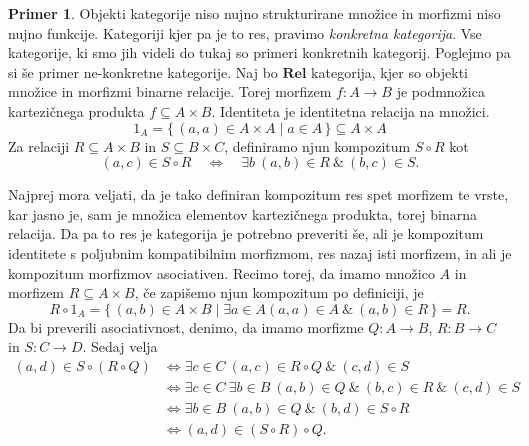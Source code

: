 \documentclass[12pt,a4paper]{book}
\theoremstyle{definition}
\theoremstyle{plain}
\theoremstyle{definition}
\newtheorem{primer}{Primer}[section]
\theoremstyle{remark}
\newcommand{\cat}[1]{\textbf{#1}}
\renewcommand{\set}[1]{\{\,#1\,\}}
\begin{document}
\begin{primer}
Objekti kategorije niso nujno strukturirane množice in morfizmi niso nujno funkcije. Kategoriji kjer pa je to res, pravimo \emph{konkretna kategorija}. Vse kategorije, ki smo jih videli do tukaj so primeri konkretnih kategorij. 
Poglejmo pa si še primer ne-konkretne kategorije. Naj bo $\cat{Rel}$ kategorija, kjer so objekti množice in morfizmi binarne relacije. Torej morfizem $f : A \to B$ je podmnožica kartezičnega produkta $f \subseteq A \times B$. Identiteta je identitetna relacija na množici.
$$ 1_A = \set{(a,a) \in A \times A \mid a \in A} \subseteq A \times A$$
Za relaciji $R \subseteq A \times B$ in $S \subseteq B \times C$, definiramo njun kompozitum $S \circ R$ kot
$$(a,c) \in S \circ R \quad \Leftrightarrow \quad \exists b \ (a,b) \in R \ \& \ (b,c) \in S.$$

Najprej mora veljati, da je tako definiran kompozitum res spet morfizem te vrste, kar jasno je, sam je množica elementov kartezičnega produkta, torej binarna relacija. Da pa to res je kategorija je potrebno preveriti še, ali je kompozitum identitete s poljubnim kompatibilnim morfizmom, res nazaj isti morfizem, in ali je kompozitum morfizmov asociativen. Recimo torej, da imamo množico $A$ in morfizem $R \subseteq A \times B$, če zapišemo njun kompozitum po definiciji, je
$$R \circ 1_A = \set{(a,b) \in A \times B \mid \exists a \in A (a,a) \in A \ \& \ (a,b)\in R} = R.$$
Da bi preverili asociativnost, denimo, da imamo morfizme $Q:A \to B$, $R:B \to C$ in $S: C \to D$. Sedaj velja
\begin{align*}
(a,d) \in S \circ (R \circ Q) &\Leftrightarrow \exists c \in C \ (a,c) \in R \circ Q \ \& \ (c,d) \in S \\
&\Leftrightarrow \exists c \in C \ \exists b \in B \ (a,b) \in Q \ \& \ (b,c) \in R \ \& \ (c,d) \in S \\
&\Leftrightarrow \exists b \in B \ (a,b) \in Q \ \& \ (b,d) \in S \circ R \\
&\Leftrightarrow (a,d) \in (S \circ R) \circ Q.
\end{align*}

\end{primer}
\end{document}
